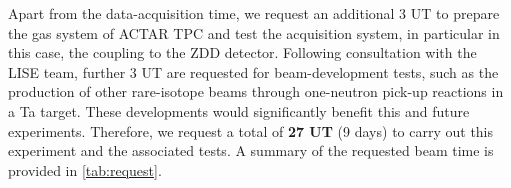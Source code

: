 \documentclass[a4paper, 10pt]{article}
\newcommand{\iso}[2]{\ce{^{#1}#2}}
\begin{document}
Apart from the data-acquisition time, we request an additional 3 UT to prepare the gas system of ACTAR TPC and test the acquisition system, in particular in this case, the coupling to the ZDD detector. Following consultation with the LISE team, further 3 UT are requested for beam-development tests, such as the production of other rare-isotope beams through one-neutron pick-up reactions in a Ta target. These developments would significantly benefit this and future experiments. Therefore, we request a total of \textbf{27 UT} (9 days) to carry out this experiment and the associated tests. A summary of the requested beam time is provided in \autoref{tab:request}.


\printbibliography
\end{document}
